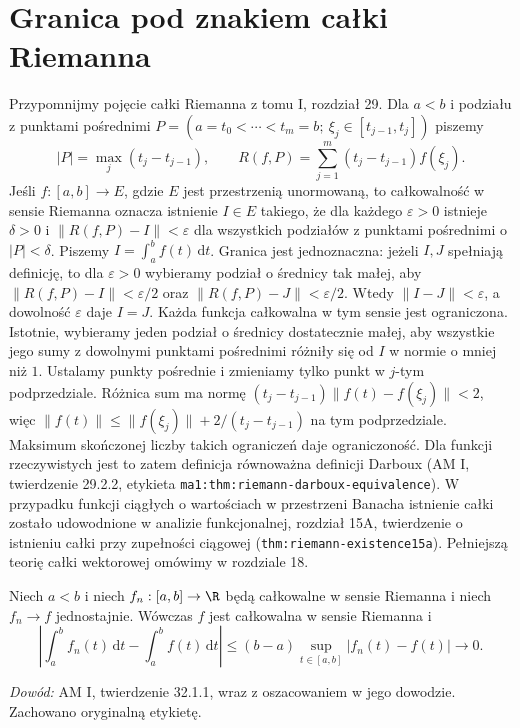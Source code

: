\section{Granica pod znakiem całki Riemanna}

Przypomnijmy pojęcie całki Riemanna z tomu I,
rozdział 29. Dla $a<b$ i podziału z punktami
pośrednimi $P=(a=t_0<\cdots<t_m=b;\
\xi_j\in[t_{j-1},t_j])$ piszemy
\[
 |P|=\max_j(t_j-t_{j-1}),\qquad
 R(f,P)=\sum_{j=1}^{m}(t_j-t_{j-1})f(\xi_j).
\]
Jeśli $f:[a,b]\to E$, gdzie $E$ jest przestrzenią
unormowaną, to całkowalność w sensie Riemanna
oznacza istnienie $I\in E$ takiego, że
dla każdego $\varepsilon>0$ istnieje $\delta>0$
i $\|R(f,P)-I\|<\varepsilon$ dla wszystkich
podziałów z punktami pośrednimi o $|P|<\delta$.
Piszemy $I=\int_a^b f(t)\,\mathrm dt$.
Granica jest jednoznaczna: jeżeli $I,J$
spełniają definicję, to dla $\varepsilon>0$
wybieramy podział o średnicy tak małej, aby
$\|R(f,P)-I\|<\varepsilon/2$ oraz
$\|R(f,P)-J\|<\varepsilon/2$. Wtedy
$\|I-J\|<\varepsilon$, a dowolność
$\varepsilon$ daje $I=J$.
Każda funkcja całkowalna w tym sensie jest
ograniczona. Istotnie, wybieramy jeden podział
o średnicy dostatecznie małej, aby wszystkie jego
sumy z dowolnymi punktami pośrednimi różniły się
od $I$ w normie o mniej niż $1$. Ustalamy punkty
pośrednie i zmieniamy tylko punkt w $j$-tym
podprzedziale. Różnica sum ma normę
$(t_j-t_{j-1})\|f(t)-f(\xi_j)\|<2$, więc
$\|f(t)\|\le\|f(\xi_j)\|+2/(t_j-t_{j-1})$
na tym podprzedziale. Maksimum skończonej
liczby takich ograniczeń daje ograniczoność.
Dla funkcji rzeczywistych jest to zatem definicja
równoważna definicji Darboux (AM I, twierdzenie
29.2.2, etykieta \texttt{ma1:thm:riemann-darboux-equivalence}).
W przypadku funkcji ciągłych o wartościach
w przestrzeni Banacha istnienie całki zostało
udowodnione w analizie funkcjonalnej, rozdział 15A,
twierdzenie o istnieniu całki przy zupełności
ciągowej (\texttt{thm:riemann-existence15a}).
Pełniejszą teorię całki wektorowej omówimy
w rozdziale 18.

\begin{twierdzenie}
\label{ma1:thm:riemann-uniform-limit}
Niech $a<b$ i niech $f_n:[a,b]\to\R$ będą całkowalne
w sensie Riemanna i niech $f_n\to f$ jednostajnie.
Wówczas $f$ jest całkowalna w sensie Riemanna i
\[
 \left|\int_a^b f_n(t)\,\mathrm dt-
              \int_a^b f(t)\,\mathrm dt\right|
 \le (b-a)\sup_{t\in[a,b]}|f_n(t)-f(t)|
 \longrightarrow0.
\]
\end{twierdzenie}
\emph{Dowód:} AM I, twierdzenie 32.1.1, wraz
z oszacowaniem w jego dowodzie. Zachowano
oryginalną etykietę.

